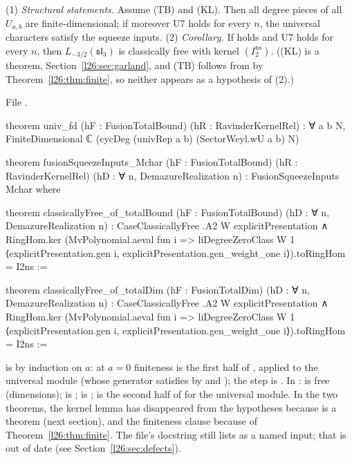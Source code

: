 \begin{theorem}\label{l26:thm:a2assembly}
(1) \emph{Structural statements.} Assume (TB) and (KL). Then all degree pieces of all $U_{a,b}$ are finite-dimensional; if
moreover U7 holds for every $n$, the universal characters  satisfy the squeeze inputs.
(2) \emph{Corollary.} If  holds and U7 holds for every $n$, then $L_{-3/2}(\mathfrak{sl}_3)$ is classically
free with kernel $(I_2^{\mathrm{ns}})$. ((KL) is a theorem, Section~\ref{l26:sec:garland}, and (TB) follows from
 by Theorem~\ref{l26:thm:finite}, so neither appears as a hypothesis of (2).)
\end{theorem}
\noindent File .
\begin{leancode}
theorem univ_fd (hF : FusionTotalBound) (hR : RavinderKernelRel) :
    ∀ a b N, FiniteDimensional ℂ (cycDeg (univRep a b) (SectorWeyl.wU a b) N)

theorem fusionSqueezeInputs_Mchar (hF : FusionTotalBound) (hR : RavinderKernelRel)
    (hD : ∀ n, DemazureRealization n) : FusionSqueezeInputs Mchar where

theorem classicallyFree_of_totalBound (hF : FusionTotalBound) (hD : ∀ n, DemazureRealization n) :
    CaseClassicallyFree .A2 W explicitPresentation ∧
      RingHom.ker (MvPolynomial.aeval fun i =>
        liDegreeZeroClass W 1 ⟨explicitPresentation.gen i,
          explicitPresentation.gen_weight_one i⟩).toRingHom = I2ns :=

theorem classicallyFree_of_totalDim (hF : FusionTotalDim) (hD : ∀ n, DemazureRealization n) :
    CaseClassicallyFree .A2 W explicitPresentation ∧
      RingHom.ker (MvPolynomial.aeval fun i =>
        liDegreeZeroClass W 1 ⟨explicitPresentation.gen i,
          explicitPresentation.gen_weight_one i⟩).toRingHom = I2ns :=
\end{leancode}

\begin{dictionary}
 is by induction on $a$: at $a=0$ finiteness is the first half of , applied to the
universal module (whose generator satisfies  by  and ); the
step is . In :  is free (dimensions);  is
;  is ;  is the second half of
 for the universal module. In the two  theorems, the kernel lemma has
disappeared from the hypotheses because  is a theorem (next section), and the finiteness clause
because of Theorem~\ref{l26:thm:finite}. The file's docstring still lists  as a named input; that
is out of date (see Section~\ref{l26:sec:defects}).
\end{dictionary}

